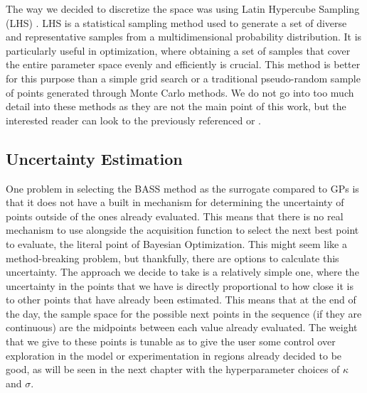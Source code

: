 The way we decided to discretize the space was using Latin Hypercube Sampling (LHS) \cite{mckay2000comparison}. LHS is a statistical sampling method used to generate a set of diverse and representative samples from a multidimensional probability distribution. It is particularly useful in optimization, where obtaining a set of samples that cover the entire parameter space evenly and efficiently is crucial. This method is better for this purpose than a simple grid search or a traditional pseudo-random sample of points generated through Monte Carlo methods. We do not go into too much detail into these methods as they are not the main point of this work, but the interested reader can look to the previously referenced \cite{mckay2000comparison} or \cite{stein1987large}. 

\subsection{Uncertainty Estimation}

One problem in selecting the BASS method as the surrogate compared to GPs is that it does not have a built in mechanism for determining the uncertainty of points outside of the ones already evaluated. This means that there is no real mechanism to use alongside the acquisition function to select the next best point to evaluate, the literal point of Bayesian Optimization. This might seem like a method-breaking problem, but thankfully, there are options to calculate this uncertainty. The approach we decide to take is a relatively simple one, where the uncertainty in the points that we have is directly proportional to how close it is to other points that have already been estimated. This means that at the end of the day, the sample space for the possible next points in the sequence (if they are continuous) are the midpoints between each value already evaluated. The weight that we give to these points is tunable as to give the user some control over exploration in the model or experimentation in regions already decided to be good, as will be seen in the next chapter with the hyperparameter choices of $\kappa$ and $\sigma$.

